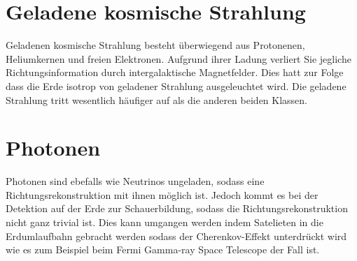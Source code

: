 \section{Geladene kosmische Strahlung}
Geladenen kosmische Strahlung besteht überwiegend aus Protonenen, Heliumkernen und freien Elektronen. Aufgrund ihrer Ladung verliert Sie jegliche Richtungsinformation durch intergalaktische Magnetfelder. Dies hatt zur Folge dass die Erde isotrop von geladener Strahlung ausgeleuchtet wird. Die geladene Strahlung tritt wesentlich häufiger auf als die anderen beiden Klassen. 

\section{Photonen}
Photonen sind ebefalls wie Neutrinos ungeladen, sodass eine Richtungsrekonstruktion mit ihnen möglich ist. Jedoch kommt es bei der Detektion auf der Erde zur Schauerbildung, sodass die Richtungsrekonstruktion nicht ganz trivial ist. Dies kann umgangen werden indem Satelieten in die Erdumlaufbahn gebracht werden sodass der Cherenkov-Effekt unterdrückt wird wie es zum Beispiel beim Fermi Gamma-ray Space Telescope der Fall ist.

